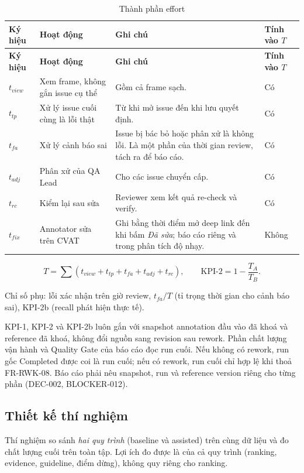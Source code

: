 \begin{xltabular}{\linewidth}{@{}L{1.4cm}L{4.2cm}Y C{1.6cm}@{}}
\caption{Thành phần effort}\label{tab:effort}\\
\toprule
\textbf{Ký hiệu} & \textbf{Hoạt động} & \textbf{Ghi chú} & \textbf{Tính vào \(T\)}\\
\midrule
\endfirsthead
\toprule \textbf{Ký hiệu} & \textbf{Hoạt động} & \textbf{Ghi chú} & \textbf{Tính vào \(T\)}\\ \midrule
\endhead
\bottomrule
\endfoot
\(t_{view}\) & Xem frame, không gắn issue cụ thể & Gồm cả frame sạch. & Có\\
\(t_{tp}\) & Xử lý issue cuối cùng là lỗi thật & Từ khi mở issue đến khi lưu quyết định. & Có\\
\(t_{fa}\) & Xử lý cảnh báo sai & Issue bị bác bỏ hoặc phân xử là không lỗi. Là một phần của thời gian review, tách ra để báo cáo. & Có\\
\(t_{adj}\) & Phân xử của QA Lead & Cho các issue chuyển cấp. & Có\\
\(t_{rc}\) & Kiểm lại sau sửa & Reviewer xem kết quả re-check và verify. & Có\\
\(t_{fix}\) & Annotator sửa trên CVAT & Ghi bằng thời điểm mở deep link đến khi bấm \emph{Đã sửa}; báo cáo riêng và trong phân tích độ nhạy. & Không\\
\end{xltabular}

\[
  T = \sum \left(t_{view} + t_{tp} + t_{fa} + t_{adj} + t_{rc}\right), \qquad
  \text{KPI-2} = 1 - \frac{T_A}{T_B}.
\]

Chỉ số phụ: lỗi xác nhận trên giờ review, \(t_{fa}/T\) (tỉ trọng thời gian cho cảnh
báo sai), KPI-2b (recall phát hiện thực tế).

KPI-1, KPI-2 và KPI-2b luôn gắn với snapshot annotation đầu vào đã khoá và
reference đã khoá, không đổi nguồn sang revision sau rework. Phần chất lượng
vận hành và Quality Gate của báo cáo đọc run cuối. Nếu không có rework, run gốc
Completed được coi là run cuối; nếu có rework, run cuối chỉ hợp lệ khi thoả
FR-RWK-08. Báo cáo phải nêu snapshot, run và reference version riêng cho từng
phần (DEC-002, BLOCKER-012).

\subsection{Thiết kế thí nghiệm}
Thí nghiệm so sánh \emph{hai quy trình} (baseline và assisted) trên cùng dữ liệu
và đo chất lượng cuối trên toàn tập. Lợi ích đo được là của cả quy trình
(ranking, evidence, guideline, điểm dừng), không quy riêng cho ranking.

